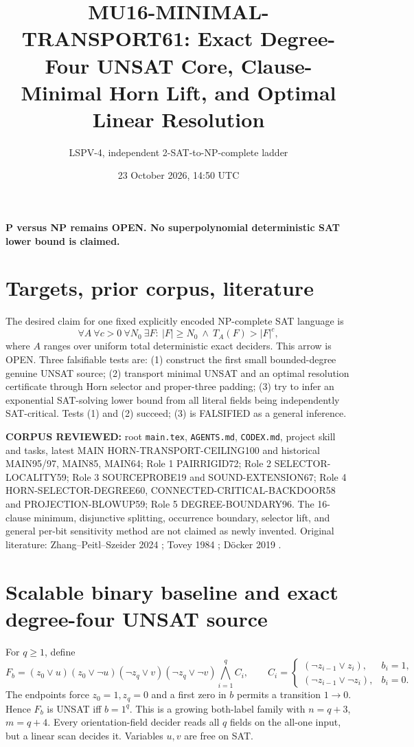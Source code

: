 \documentclass[11pt]{article}
\title{MU16-MINIMAL-TRANSPORT61: Exact Degree-Four UNSAT Core, Clause-Minimal Horn Lift, and Optimal Linear Resolution}
\author{LSPV-4, independent 2-SAT-to-NP-complete ladder}
\date{23 October 2026, 14:50 UTC}
\begin{document}
\maketitle
\begin{center}\textbf{P versus NP remains OPEN. No superpolynomial deterministic SAT lower bound is claimed.}\end{center}

\section{Targets, prior corpus, literature}
The desired claim for one fixed explicitly encoded NP-complete SAT language is
\[
\forall A\ \forall c>0\ \forall N_0\ \exists F:
\ |F|\ge N_0\ \wedge\ T_A(F)>|F|^c,
\]
where $A$ ranges over uniform total deterministic exact deciders. This arrow is OPEN. Three falsifiable tests are: (1) construct the first small bounded-degree genuine UNSAT source; (2) transport minimal UNSAT and an optimal resolution certificate through Horn selector and proper-three padding; (3) try to infer an exponential SAT-solving lower bound from all literal fields being independently SAT-critical. Tests (1) and (2) succeed; (3) is FALSIFIED as a general inference.

\noindent\textbf{CORPUS REVIEWED:} root \texttt{main.tex}, \texttt{AGENTS.md}, \texttt{CODEX.md}, project skill and tasks, latest MAIN HORN-TRANSPORT-CEILING100 and historical MAIN95/97, MAIN85, MAIN64; Role 1 PAIRRIGID72; Role 2 SELECTOR-LOCALITY59; Role 3 SOURCEPROBE19 and SOUND-EXTENSION67; Role 4 HORN-SELECTOR-DEGREE60, CONNECTED-CRITICAL-BACKDOOR58 and PROJECTION-BLOWUP59; Role 5 DEGREE-BOUNDARY96. The 16-clause minimum, disjunctive splitting, occurrence boundary, selector lift, and general per-bit sensitivity method are not claimed as newly invented. Original literature: Zhang--Peitl--Szeider 2024 \cite{zps}; Tovey 1984 \cite{tovey}; D\"ocker 2019 \cite{docker}.

\section{Scalable binary baseline and exact degree-four UNSAT source}
For $q\ge1$, define
\[
F_b=(z_0\vee u)(z_0\vee\neg u)(\neg z_q\vee v)(\neg z_q\vee\neg v)
\bigwedge_{i=1}^q C_i,\qquad
C_i=\begin{cases}(\neg z_{i-1}\vee z_i),&b_i=1,\\
(\neg z_{i-1}\vee\neg z_i),&b_i=0.\end{cases}
\]
The endpoints force $z_0=1,z_q=0$ and a first zero in $b$ permits a transition $1\to0$. Hence $F_b$ is UNSAT iff $b=1^q$. This is a growing both-label family with $n=q+3$, $m=q+4$. Every orientation-field decider reads all $q$ fields on the all-one input, but a linear scan decides it. Variables $u,v$ are free on SAT.
\end{document}

